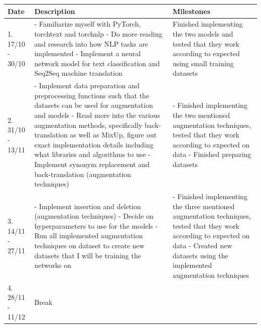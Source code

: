 \documentclass[60pt]{article}
\begin{document}
\begin{tabularx}{\textwidth}{|X|X|X|}
    \hline
    Date & 
    Description & 
    Milestones 
    \\ \hline
    1. 17/10 - 30/10 & 
    - Familiarize myself with PyTorch, torchtext and torchnlp \newline
    - Do more reading and research into how NLP tasks are implemented \newline
    - Implement a neural network model for text classification and Seq2Seq machine translation & 
    Finished implementing the two models and tested that they work according to expected using small training datasets 
    \\ \hline 
    2. 31/10 - 13/11 & 
    - Implement data preparation and preprocessing functions such that the datasets can be used for augmentation and models \newline
    - Read more into the various augmentation methods, specifically back-translation as well as MixUp, figure out exact implementation details including what libraries and algorithms to use \newline
    - Implement synonym replacement and back-translation (augmentation techniques) &
    - Finished implementing the two mentioned augmentation techniques, tested that they work according to expected on data \newline
    - Finished preparing datasets
    \\ \hline 
    3. 14/11 - 27/11 & 
    - Implement insertion and deletion (augmentation techniques) \newline
    - Decide on hyperparameters to use for the models \newline 
    - Run all implemented augmentation techniques on dataset to create new datasets that I will be training the networks on &
    - Finished implementing the three mentioned augmentation techniques, tested that they work according to expected on data \newline
    - Created new datasets using the implemented augmentation techniques
    \\ \hline
    4. 28/11 - 11/12 & 
    Break & 
    \\ \hline 
\end{tabularx}
\end{document}
